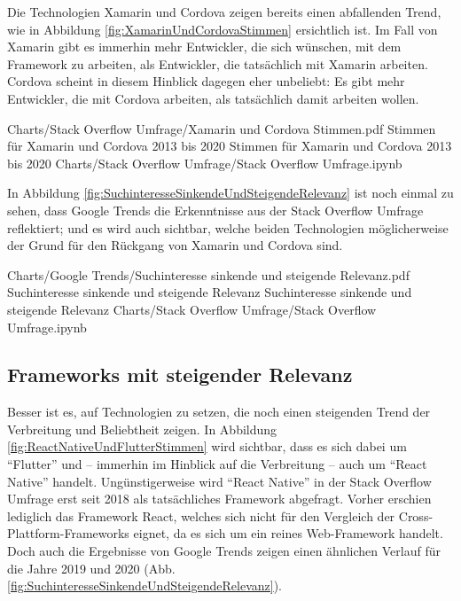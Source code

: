 Die Technologien Xamarin und Cordova zeigen bereits einen abfallenden Trend, wie in Abbildung \ref{fig:XamarinUndCordovaStimmen} ersichtlich ist.
Im Fall von Xamarin gibt es immerhin mehr Entwickler, die sich wünschen, mit dem Framework zu arbeiten, als Entwickler, die tatsächlich mit Xamarin arbeiten.
Cordova scheint in diesem Hinblick dagegen eher unbeliebt: Es gibt mehr Entwickler, die mit Cordova arbeiten, als tatsächlich damit arbeiten wollen.

\begin{alexfigurewithnotebook}{Charts/Stack Overflow Umfrage/Xamarin und Cordova Stimmen.pdf}
	{Stimmen für Xamarin und Cordova 2013 bis 2020}
	{Stimmen für Xamarin und Cordova 2013 bis 2020}
	{Charts/Stack Overflow Umfrage/Stack Overflow Umfrage.ipynb}
	{}
	\label{fig:XamarinUndCordovaStimmen}

\end{alexfigurewithnotebook}


In Abbildung \ref{fig:SuchinteresseSinkendeUndSteigendeRelevanz} ist noch einmal zu sehen, dass Google Trends die Erkenntnisse aus der Stack Overflow Umfrage reflektiert; und es wird auch sichtbar, welche beiden Technologien möglicherweise der Grund für den Rückgang von Xamarin und Cordova sind.

\begin{alexfigurewithnotebook}{Charts/Google Trends/Suchinteresse sinkende und steigende Relevanz.pdf}
	{Suchinteresse sinkende und steigende Relevanz}
	{Suchinteresse sinkende und steigende Relevanz}
	{Charts/Stack Overflow Umfrage/Stack Overflow Umfrage.ipynb}
	{}
	\label{fig:SuchinteresseSinkendeUndSteigendeRelevanz}

\end{alexfigurewithnotebook}

\subsection{Frameworks mit steigender Relevanz}

Besser ist es, auf Technologien zu setzen, die noch einen steigenden Trend der Verbreitung und Beliebtheit zeigen.
In Abbildung \ref{fig:ReactNativeUndFlutterStimmen} wird sichtbar, dass es sich dabei um \enquote{Flutter} und -- immerhin im Hinblick auf die Verbreitung -- auch um \enquote{React Native} handelt.
Ungünstigerweise wird \enquote{React Native} in der Stack Overflow Umfrage erst seit 2018 als tatsächliches Framework abgefragt.
Vorher erschien lediglich das Framework React, welches sich nicht für den Vergleich der Cross-Plattform-Frameworks eignet, da es sich um ein reines Web-Framework handelt.
Doch auch die Ergebnisse von Google Trends zeigen einen ähnlichen Verlauf für die Jahre 2019 und 2020 (Abb. \ref{fig:SuchinteresseSinkendeUndSteigendeRelevanz}).

